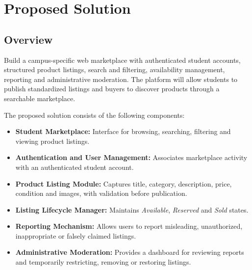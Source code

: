 \documentclass[11pt,a4paper]{article}
\begin{document}
\section{Proposed Solution}

\subsection{Overview}

Build a campus-specific web marketplace with authenticated student
accounts, structured product listings, search and filtering,
availability management, reporting and administrative moderation.
The platform will allow students to publish standardized listings
and buyers to discover products through a searchable marketplace.

The proposed solution consists of the following components:

\begin{itemize}

    \item \textbf{Student Marketplace:}
    Interface for browsing, searching, filtering and viewing product
    listings.

    \item \textbf{Authentication and User Management:}
    Associates marketplace activity with an authenticated student
    account.

    \item \textbf{Product Listing Module:}
    Captures title, category, description, price, condition and
    images, with validation before publication.

    \item \textbf{Listing Lifecycle Manager:}
    Maintains \textit{Available}, \textit{Reserved} and
    \textit{Sold} states.

    \item \textbf{Reporting Mechanism:}
    Allows users to report misleading, unauthorized, inappropriate
    or falsely claimed listings.

    \item \textbf{Administrative Moderation:}
    Provides a dashboard for reviewing reports and temporarily
    restricting, removing or restoring listings.

\end{itemize}

\end{document}
